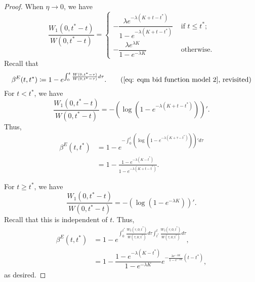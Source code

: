 \documentclass[12pt, letterpaper]{article}
\begin{document}
\begin{proof} %
When $\eta \to 0$, we have
\begin{equation}
    \frac{W_1(0, t^* - t)}{W(0, t^* - t)} = \begin{cases}
        - \dfrac{\lambda e^{- \lambda(K + t - t^*)}}{1 - e^{-\lambda (K + t- t^*)}} & \text{ if } t \le t^*;\\
        - \dfrac{\lambda e^{\lambda K}}{1 - e^{- \lambda K}} & \text{ otherwise.}
    \end{cases}
\end{equation}
Recall that 
\begin{equation} %
    \beta^E(t, t^*) \coloneqq 1 - e^{\int_0^t \frac{W(0, t^* - \tau)}{W(0, t^* - \tau)}d\tau}. \tag{\ref{eq: eqm bid function model 2}, revisited}
\end{equation}
For $t < t^*$, we have
\begin{equation}
    \frac{W_1(0, t^* - t)}{W(0, t^* - t)} = - \left(\log\left(1 - e^{-\lambda(K + t - t^*)} \right) \right)'.
\end{equation}
Thus,
\begin{align}
    \beta^E(t, t^*) & = 1 - e^{- \int_0^t \left(\log\left(1 - e^{-\lambda(K + \tau - t^*)} \right) \right)'d\tau}\\
    & = 1 - \frac{1 - e^{-\lambda(K - t^*)}}{1 - e^{-\lambda(K + t - t^*)}}.
\end{align}

For $t \ge t^*$, we have
\begin{equation}
    \frac{W_1(0, t^* - t)}{W(0, t^* - t)} = - \left(\log\left(1 - e^{-\lambda K} \right) \right)'.
\end{equation}
Recall that this is independent of $t$. Thus, 
\begin{align}
    \beta^E(t, t^*) &= 1 - e^{\int_0^{t^*} \frac{W_2(\tau, 0; t^*)}{W(\tau, 0; t^*)}d\tau \int_{t^*}^{t} \frac{W_2(\tau, 0; t^*)}{W(\tau, 0; t^*)}d\tau},\\
    &= 1 - \dfrac{1 - e^{-\lambda(K - t^*)}}{1 - e^{-\lambda K}} e^{- \frac{\lambda e^{- \lambda K}}{1 - e^{- \lambda K}}(t -t^*)},
\end{align}
as desired.
\end{proof} %
\end{document}
